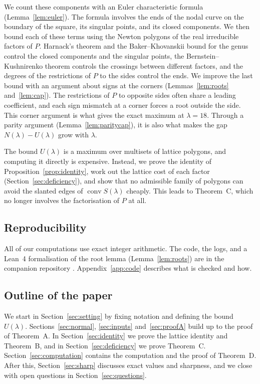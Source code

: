 \documentclass[11pt]{amsart}
\theoremstyle{definition}
\theoremstyle{remark}
\newcommand{\conv}{\operatorname{conv}}
\numberwithin{equation}{section}
\begin{document}
We count these components with an Euler characteristic formula (Lemma~\ref{lem:euler}). The
formula involves the ends of the nodal curve on the boundary of the square, its singular points,
and its closed components. We then bound each of these terms using the Newton polygons of the
real irreducible factors of $P$. Harnack's theorem and the Baker--Khovanskii bound for the genus
control the closed components and the singular points, the Bernstein--Kushnirenko theorem
controls the crossings between different factors, and the degrees of the restrictions of $P$ to
the sides control the ends. We improve the last bound with an argument about signs at the
corners (Lemmas~\ref{lem:roots} and~\ref{lem:cap}). The restrictions of $P$ to opposite sides
often share a leading coefficient, and each sign mismatch at a corner forces a root outside the
side. This corner argument is what gives the exact maximum at $\lambda=18$. Through a parity
argument (Lemma~\ref{lem:paritycap}), it is also what makes the gap $N(\lambda)-U(\lambda)$
grow with $\lambda$.

The bound $U(\lambda)$ is a maximum over multisets of lattice polygons, and computing it
directly is expensive. Instead, we prove the identity of Proposition~\ref{prop:identity}, work
out the lattice cost of each factor (Section~\ref{sec:deficiency}), and show that no admissible
family of polygons can avoid the slanted edges of $\conv S(\lambda)$ cheaply. This leads to
Theorem~C, which no longer involves the factorisation of $P$ at all.

\subsection{Reproducibility}

All of our computations use exact integer arithmetic. The code, the logs, and a Lean~4
formalisation of the root lemma (Lemma~\ref{lem:roots}) are in the companion repository
\cite{repo}. Appendix~\ref{app:code} describes what is checked and how.

\subsection*{Outline of the paper}
We start in Section~\ref{sec:setting} by fixing notation and defining the bound $U(\lambda)$.
Sections~\ref{sec:normal}, \ref{sec:inputs} and~\ref{sec:proofA} build up to the proof of
Theorem~A. In Section~\ref{sec:identity} we prove the lattice identity and Theorem~B, and in
Section~\ref{sec:deficiency} we prove Theorem~C. Section~\ref{sec:computation} contains the
computation and the proof of Theorem~D. After this, Section~\ref{sec:sharp} discusses exact
values and sharpness, and we close with open questions in Section~\ref{sec:questions}.
\end{document}
